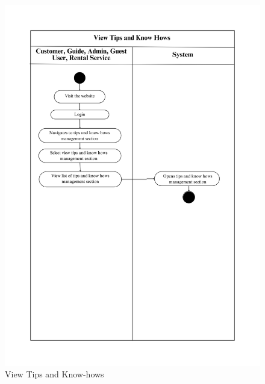 \begin{figure}[h]
    \centering
    \includegraphics[width=1\textwidth]{Images/Activity Diagrams/32 View Tips and Know Hows.png}
    \caption{View Tips and Know-hows}
    \label{fig:activity-view-tips}
\end{figure}

